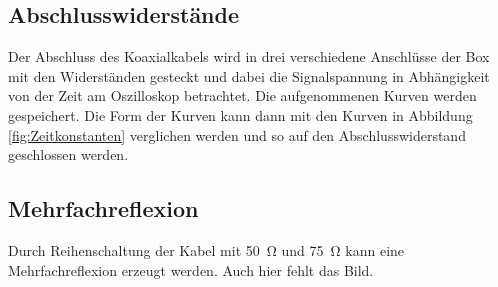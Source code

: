 \subsection*{Abschlusswiderstände}
Der Abschluss des Koaxialkabels wird in drei verschiedene Anschlüsse der Box mit den Widerständen gesteckt und dabei die Signalspannung in Abhängigkeit von der Zeit am Oszilloskop betrachtet. Die aufgenommenen Kurven werden gespeichert. Die Form der Kurven kann dann mit den Kurven in Abbildung \ref{fig:Zeitkonstanten} verglichen werden und so auf den Abschlusswiderstand geschlossen werden.
\subsection*{Mehrfachreflexion}
Durch Reihenschaltung der Kabel mit \SI{50}{\ohm} und \SI{75}{\ohm} kann eine Mehrfachreflexion erzeugt werden. Auch hier fehlt das Bild.